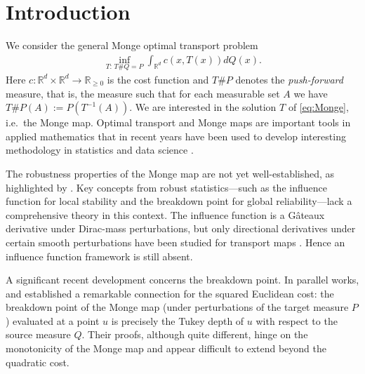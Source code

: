 \documentclass[11pt]{article}
\theoremstyle{plain}
\theoremstyle{definition}\newtheorem{definition}[theorem]{Definition}
\theoremstyle{remark}
\begin{document}
 \section{Introduction}
We consider the  general Monge  optimal transport problem \citep{monge1781,GangboMcCann.96}
%
\begin{align}\label{eq:Monge}\tag{MP}
\inf_{T:\, T\#Q=P}\int_{\mathbb{R}^d} c({x},T({x})) d Q({x}). 
\end{align}
%
Here $c:\mathbb{R}^d\times \mathbb{R}^d\to \mathbb{R}_{\geq 0}$ is the cost function and $T\#P$ denotes the \emph{push-forward} measure, that is, the measure such that for each measurable set $A$ we have $T\#P(A):=P(T^{-1}(A))$. We are interested in the solution $T$ of \eqref{eq:Monge}, i.e.~the Monge map. Optimal transport and Monge maps are important tools in applied mathematics \citep{Santambrogio-Book} that in recent years have been used to develop interesting methodology in statistics \citep{HallinDelBarrioCuestaAlbertosMatran.21,chewi:nilesweed:rigollet2025}  and data science \citep{PeyreCuturi.19}.  
%

 

The robustness properties of the Monge map are not yet well-established, as highlighted by \citet{ronchetti2023}. Key concepts from robust statistics---such as the influence function for local stability and the breakdown point for global reliability---lack a comprehensive theory in this context. The influence function is a G\^ateaux derivative under Dirac-mass perturbations, but only directional derivatives under certain smooth perturbations have been studied for transport maps \citep{Loeper.09,gonzálezsanz2024linearizationmongeampereequationsdata}. Hence an influence function framework is still absent.

A significant recent development concerns the breakdown point. In parallel works, \citet{paindaveine:passeggeri2024} and \citet{Avella-Gonzalez.25} established a remarkable connection for the squared Euclidean cost: the breakdown point of the Monge map (under perturbations of the target measure \( P \)) evaluated at a point \( u \) is precisely the Tukey depth of \( u \) with respect to the source measure \( Q \). Their proofs, although quite different, hinge on the monotonicity of the Monge map and appear difficult to extend beyond the quadratic cost.
\end{document}
